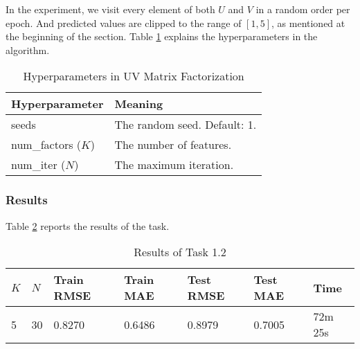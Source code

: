 \documentclass[12pt]{article}
\begin{document}
In the experiment, we visit every element of both $U$ and $V$ in a random order per epoch. And predicted values are clipped to the range of $[1,5]$, as mentioned at the beginning of the section. Table \ref{tab:1.2-hyper} explains the hyperparameters in the algorithm.
\begin{table}[ht]
    \centering
    \caption{Hyperparameters in UV Matrix Factorization}
    \label{tab:1.2-hyper}
    \begin{tabular}{ll}
        \toprule
        \textbf{Hyperparameter} & \textbf{Meaning}\\
        \midrule
        seeds & The random seed. Default: 1.\\
        num\_factors ($K$) & The number of features.\\
        num\_iter ($N$) & The maximum iteration.\\
        \bottomrule
    \end{tabular}
\end{table}

\subsubsection{Results}
Table \ref{tab:1.2-re} reports the results of the task.
\begin{table}[ht]
    \centering
    \caption{Results of Task 1.2}
    \label{tab:1.2-re}
    \begin{tabular}{lllllll}
        \toprule
        \textbf{$K$} & \textbf{$N$} & \textbf{Train RMSE} & \textbf{Train MAE} & \textbf{Test RMSE} & \textbf{Test MAE} & \textbf{Time}\\
        \midrule
        5 & 30 & 0.8270 & 0.6486 & 0.8979 & 0.7005 & 72m 25s\\
        \bottomrule
    \end{tabular}
\end{table}
\end{document}
